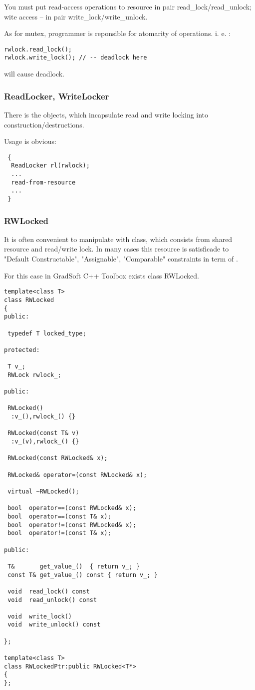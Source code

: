 \documentclass[10pt]{article}
\begin{document}
 You must put read-access operations to resource in pair read\_lock/read\_unlock; wite access -- in pair write\_lock/write\_unlock.

 As for mutex, programmer is reponsible for atomarity of operations.
 i. e. :
\begin{verbatim}
rwlock.read_lock();
rwlock.write_lock(); // -- deadlock here
\end{verbatim}
 will cause deadlock.

 
\subsubsection{ ReadLocker, WriteLocker }

 There is the objects, which incapsulate read and write locking into construction/destructions.

 Usage is obvious:

\begin{verbatim}
 {
  ReadLocker rl(rwlock);
  ...
  read-from-resource
  ...
 }
\end{verbatim}


\subsubsection{ RWLocked }

 It is often convenient to manipulate with class, which consists from
shared resource and read/write lock. In many cases this resource is 
satisficade to "Default Constructable", "Assignable", "Comparable" constraints
in term of
 \cite{SGI-STL} .

For this case in GradSoft C++ Toolbox exists class RWLocked.

\begin{verbatim}
template<class T>
class RWLocked
{
public:

 typedef T locked_type;

protected:

 T v_;
 RWLock rwlock_;

public:
 
 RWLocked()
  :v_(),rwlock_() {}

 RWLocked(const T& v)
  :v_(v),rwlock_() {} 

 RWLocked(const RWLocked& x);

 RWLocked& operator=(const RWLocked& x);

 virtual ~RWLocked();

 bool  operator==(const RWLocked& x);
 bool  operator==(const T& x);
 bool  operator!=(const RWLocked& x);
 bool  operator!=(const T& x);
 
public:

 T&       get_value_()  { return v_; }
 const T& get_value_() const { return v_; }

 void  read_lock() const
 void  read_unlock() const

 void  write_lock()
 void  write_unlock() const

};

template<class T>
class RWLockedPtr:public RWLocked<T*>
{
};
\end{verbatim}
\end{document}
